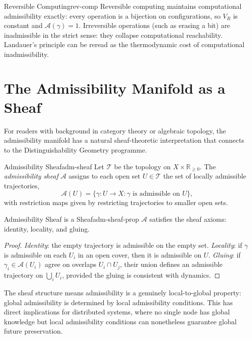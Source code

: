 \documentclass[12pt,twoside,openright]{book}
\begin{document}
\begin{example}{Reversible Computing}{rev-comp}
  Reversible computing maintains computational admissibility
  exactly: every operation is a bijection on configurations,
  so $V_R$ is constant and $\mathcal{A}(\gamma)=1$.
  Irreversible operations (such as erasing a bit) are
  inadmissible in the strict sense: they collapse
  computational reachability. Landauer's principle
  \parencite{landauer1961irreversibility} can be reread as
  the thermodynamic cost of computational inadmissibility.
\end{example}

\section{The Admissibility Manifold as a Sheaf}
\label{sec:ch14-sheaf}

For readers with background in category theory or algebraic
topology, the admissibility manifold has a natural
sheaf-theoretic interpretation that connects to the
Distinguishability Geometry programme.

\begin{definition}{Admissibility Sheaf}{adm-sheaf}
  Let $\mathcal{T}$ be the topology on
  $X\times\mathbb{R}_{\ge0}$. The \emph{admissibility sheaf}
  $\mathcal{A}$ assigns to each open set $U\in\mathcal{T}$
  the set of locally admissible trajectories,
  \[
    \mathcal{A}(U)
    = \{\gamma : U \to X : \gamma \text{ is admissible on } U\},
  \]
  with restriction maps given by restricting trajectories
  to smaller open sets.
\end{definition}

\begin{proposition}{Admissibility Sheaf is a Sheaf}{adm-sheaf-prop}
  $\mathcal{A}$ satisfies the sheaf axioms: identity,
  locality, and gluing.
\end{proposition}

\begin{proof}
  \emph{Identity}: the empty trajectory is admissible on
  the empty set. \emph{Locality}: if $\gamma$ is admissible
  on each $U_i$ in an open cover, then it is admissible on
  $U$. \emph{Gluing}: if $\gamma_i\in\mathcal{A}(U_i)$
  agree on overlaps $U_i\cap U_j$, their union defines an
  admissible trajectory on $\bigcup_i U_i$, provided the
  gluing is consistent with dynamics.
\end{proof}

The sheaf structure means admissibility is a genuinely
local-to-global property: global admissibility is
determined by local admissibility conditions. This has
direct implications for distributed systems, where no
single node has global knowledge but local admissibility
conditions can nonetheless guarantee global future
preservation.
\end{document}
